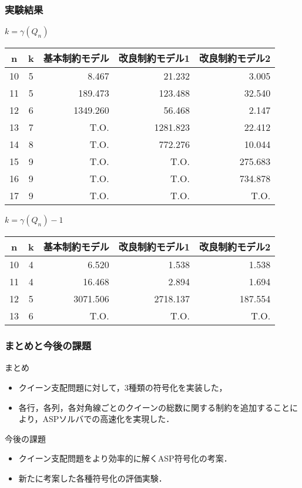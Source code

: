 \documentclass[dvipdfmx,10pt]{beamer}
\begin{document}
\begin{frame}\frametitle{実験結果}
 \begin{block}{$k=\gamma(Q_{n})$}
  \begin{table}[ht]
   \centering
   \begin{tabular}{c|c|r|r|r}
   n &k &基本制約モデル &改良制約モデル1 &改良制約モデル2 \\ \hline
   10 & 5 & 8.467 & 21.232 & 3.005 \\
   11 & 5 & 189.473 & 123.488 & 32.540 \\
   12 & 6 & 1349.260 & 56.468 & 2.147 \\
   13 & 7 & T.O. & 1281.823 & 22.412 \\
   14 & 8 & T.O. & 772.276 & 10.044 \\
   15 & 9 & T.O. & T.O. & 275.683 \\
   16 & 9 & T.O. & T.O. & 734.878 \\
   17 & 9 & T.O. & T.O. & T.O. \\
   \end{tabular}
  \end{table}
 \end{block}
 \begin{block}{$k=\gamma(Q_{n})-1$}
  \begin{table}[ht]
   \centering
   \begin{tabular}{c|c|r|r|r}
    n & k & 基本制約モデル & 改良制約モデル1 & 改良制約モデル2 \\ \hline
    10 & 4 & 6.520 & 1.538 & 1.538 \\
    11 & 4 & 16.468 & 2.894 & 1.694 \\
    12 & 5 & 3071.506 & 2718.137 & 187.554 \\
    13 & 6 & T.O. & T.O. & T.O. \\  
   \end{tabular}
  \end{table}
 \end{block}
\end{frame}

\begin{frame}\frametitle{まとめと今後の課題}
 \begin{block}{まとめ}
  \begin{itemize}
   \item クイーン支配問題に対して，3種類の符号化を実装した，
   \item 各行，各列，各対角線ごとのクイーンの総数に関する制約を追加することにより，ASPソルバでの高速化を実現した．
  \end{itemize}
 \end{block}
 \begin{alertblock}{今後の課題}
  \begin{itemize}
   \item クイーン支配問題をより効率的に解くASP符号化の考案．
   \item 新たに考案した各種符号化の評価実験．
  \end{itemize}
 \end{alertblock}
\end{frame}


\end{document}
